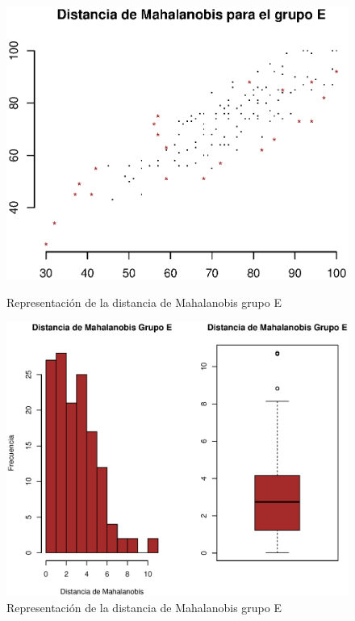 \documentclass{article}
\begin{document}
    \begin{figure}[H]
        \begin{minipage}[b]{0.45\linewidth}
            \includegraphics[scale = 0.4]{Output/Plots/MahalanobisE1.eps}
            \vspace*{-6mm}
            \caption{Representaci\'on de la distancia de Mahalanobis grupo E}
            \label{fig:minipage1}
        \end{minipage}
        \hspace{0.2cm}
        \begin{minipage}[b]{0.45\linewidth}
            \includegraphics[scale = 0.4]{Output/Plots/MahalanobisE2.eps}
            \vspace*{-6mm}
            \caption{Representaci\'on de la distancia de Mahalanobis grupo E}
            \label{fig:minipage2}
        \end{minipage}
    \end{figure}
\end{document}
